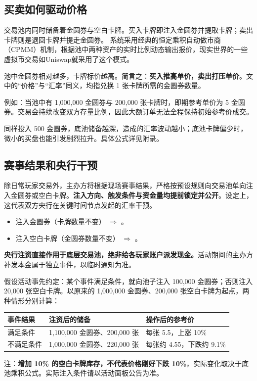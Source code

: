 \documentclass[11pt,a4paper,twoside]{article}
\newcommand{\gold}{金圆券}
\newcommand{\cards}{空白卡牌}
\begin{document}
\subsection{买卖如何驱动价格}

交易池内同时储备着\gold{}与\cards{}。买入卡牌即注入\gold{}并提取卡牌；卖出卡牌则是退回卡牌并提走\gold{}。
系统采用经典的恒定乘积自动做市商（CPMM）机制，根据池中两种资产的实时比例动态输出报价，现实世界的一些虚拟币交易如Uniswap就采用了这个模式。

池中\gold{}相对越多，卡牌标价越高。简言之：\textbf{买入推高单价，卖出打压单价}。文中的“价格”与“汇率”同义，均指兑换 1 张卡牌所需的\gold{}数量。

例如：当池中有 1,000,000 \gold{}与 200,000 张卡牌时，即期参考单价为 5 \gold{}。交易会持续改变双方存量比例，因此大额订单无法全程保持初始参考价成交。

同样投入 500 \gold{}，底池储备越深，造成的汇率波动越小；底池卡牌偏少时，微小的买盘也能引发剧烈拉升。具体公式详见附录。
\subsection{赛事结果和央行干预}

除日常玩家交易外，主办方将根据现场赛事结果，严格按预设规则向交易池单向注入\gold{}或\cards{}。\textbf{注入方向、触发条件与资金量均提前锁定并公开}。设定上，这代表双方央行在关键时间节点发起的汇率干预。

\begin{itemize}
  \item 注入\gold{}（卡牌数量不变） $\Rightarrow$ 。
  \item 注入\cards{}（\gold{}数量不变） $\Rightarrow$ 。
\end{itemize}

\textbf{央行注资直接作用于底层交易池，绝非给各玩家账户派发现金。}活动期间的主办方补发本金属于独立事件，以临时通知为准。

\begin{exbox}[title={例：同一个事件的两种干预},breakable=false]
假设活动事先约定：某个事件满足条件，就向池子注入 100,000 \gold{}；否则注入 20,000 张\cards{}。以原来的 1,000,000 \gold{}、200,000 张\cards{}为起点，两种情形分别计算：
\par\smallskip
\begin{tabularx}{\linewidth}{@{}l XX@{}}
\toprule
\rowcolor{lightGray}
事件结果 & 注资后的储备 & 操作后的参考价 \\
\midrule
\rowcolor{fxLong!5!white}
满足条件 & 1,100,000 \gold{}、200,000 张 & 每张 5.5，上涨 10\% \\
\rowcolor{fxShort!6!white}
不满足条件 & 1,000,000 \gold{}、220,000 张 & 每张约 4.55，下跌约 9.1\% \\
\bottomrule
\end{tabularx}
\par\smallskip
注：\textbf{增加 10\% 的\cards{}库存，不代表价格刚好下跌 10\%}，实际变化取决于底池乘积公式。实际注入条件请以活动面板公告为准。
\end{exbox}
\end{document}

